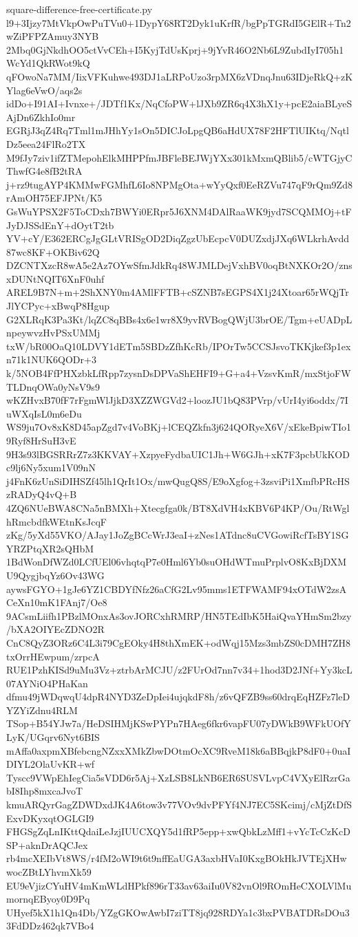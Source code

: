 \documentclass[11pt]{article}
\theoremstyle{definition}
\theoremstyle{remark}
\begin{document}
\begin{filecontents*}[overwrite]{square-difference-free-certificate.py}
l9+3Ijzy7MtVkpOwPuTVu0+1DypY68RT2Dyk1uKrfR/bgPpTGRdI5GElR+Tn2wZiPFPZAmuy3NYB
2Mbq0GjNkdhOO5ctVvCEh+I5KyjTdUsKprj+9jYvR46O2Nb6L9ZubdIyI705h1WcYd1QkRWot9kQ
qFOwoNa7MM/IixVFKuhwe493DJ1aLRPoUzo3rpMX6zVDnqJnu63IDjeRkQ+zKYlag6eVwO/aqs2s
idDo+I91AI+Ivnxe+/JDTf1Kx/NqCfoPW+lJXb9ZR6q4X3hX1y+pcE2aiaBLyeSAjDn6ZkhIo0mr
EGRjJ3qZ4Rq7Tml1mJHhYy1sOn5DICJoLpgQB6aHdUX78F2HFTlUIKtq/NqtlDz5eea24FlRo2TX
M9fJy7ziv1ifZTMepohElkMHPPfmJBFleBEJWjYXx301kMxmQBlib5/cWTGjyCThwfG4e8fB2tRA
j+rz9tugAYP4KMMwFGMhfL6Io8NPMgOta+wYyQxf0EeRZVu747qF9rQm9Zd8rAmOH75EFJPNt/K5
GsWuYPSX2F5ToCDxh7BWYi0ERpr5J6XNM4DAlRaaWK9jyd7SCQMMOj+tFJyDJSSdEnY+dOytT2tb
YV+cY/E362ERCgJgGLtVRISgOD2DiqZgzUbEcpcV0DUZxdjJXq6WLkrhAvdd87wc8KF+OKBiv62Q
DZCNTXzcR8wA5e2Az7OYwSfmJdkRq48WJMLDejVxhBV0oqBtNXKOr2O/znsxDUNtNQIT6XnF0uhf
AREL9B7N+m+2ShXNY0m4AMlFFTB+cSZNB7sEGPS4X1j24Xtoar65rWQjTrJlYCPyc+xBwqP8Hgup
G2XLRqK3Pa3Kt/lqZC8qBBs4x6e1wr8X9yvRVBogQWjU3brOE/Tgm+eUADpLnpeywvzHvPSxUMMj
txW/bR00OaQ10LDVY1dETm5SBDzZfhKcRb/IPOrTw5CCSJsvoTKKjkef3p1exn71k1NUK6QODr+3
k/5NOB4FfPHXzbkLfRpp7zysnDsDPVaShEHFI9+G+a4+VzsvKmR/mxStjoFWTLDnqOWa0yNsV9s9
wKZHvxB70fF7rFgmWlJjkD3XZZWGVd2+loozJU1bQ83PVrp/vUrI4yi6oddx/7IuWXqIsL0m6eDu
WS9ju7Ov8xK8D45apZgd7v4VoBKj+lCEQZkfn3j624QORyeX6V/xEkeBpiwTIo19Ryf8HrSuH3vE
9H3s93lBGSRRrZ7z3KKVAY+XzpyeFydbaUIC1Jh+W6GJh+xK7F3pcbUkKODc9lj6Ny5xum1V09nN
j4FnK6zUnSiDIHSZf45lh1QrIt1Ox/mwQugQ8S/E9oXgfog+3zsviPi1XmfbPRcHSzRADyQ4vQ+B
4ZQ6NUeBWA8CNa5nBMXh+Xtecgfga0k/BT8XdVH4xKBV6P4KP/Ou/RtWglhRmcbdfkWEtnKsJcqF
zKg/5yXd55VKO/AJay1JoZgBCcWrJ3eaI+zNes1ATdnc8uCVGowiRcfTsBY1SGYRZPtqXR2sQHbM
1BdWonDfWZd0LCfUEl06vhqtqP7e0Hml6Yb0suOHdWTmuPrplvO8KxBjDXMU9QygjbqYz6Ov43WG
aywsFGYO+1gJe6YZ1CBDYfNfz26aCfG2Lv95mms1ETFWAMF94xOTdW2zsACeXn10mK1FAnj7/Oe8
9ACsmLiifh1PBzlMOnxAs3ovJORCxhRMRP/HN5TEdIbK5HaiQvaYHmSm2bzy/bXA2OIYEcZDNO2R
CnC8QyZ3ORz6C4L3i79CgEOky4H8thXmEK+odWqj15Mzs3mbZS0cDMH7ZH8txOrrHEwpum/zrpcA
RUE1PzhKISd9uMu3Vz+ztrbArMCJU/z2FUrOd7nn7v34+1hod3D2JNf+Yy3kcL07AYNiO4PHaKan
dfmu49jWDqwqU4dpR4NYD3ZeDpIei4ujqkdF8h/z6vQFZB9ss60drqEqHZFz7leDYZYiZdnu4RLM
TSop+B54YJw7a/HeDSIHMjKSwPYPn7HAeg6fkr6vapFU07yDWkB9WFkUOfYLyK/UGqrv6Nyt6BIS
mAffa0axpmXBfebcngNZxxXMkZbwDOtmOcXC9RveM18k6aBBqjkP8dF0+0uaIDIYL2OlaUvKR+wf
Tyscc9VWpEhIegCia5sVDD6r5Aj+XzLSB8LkNB6ER6SUSVLvpC4VXyElRzrGabI8Ihp8mxcaJvoT
kmuARQyrGagZDWDxdJK4A6tow3v77VOv9dvPFYf4NJ7EC5SKcimj/cMjZtDfSExvDKyxqtOGLGI9
FHGSgZqLnIKttQdaiLeJzjIUUCXQY5d1fRP5epp+xwQbkLzMff1+vYcTcCzKcDSP+aknDrAQCJex
rb4mcXEIbVt8WS/r4fM2oWI9t6t9nffEaUGA3axbHVaI0KxgBOkHkJVTEjXHwwocZBtLYhvmXk59
EU9eVjizCYuHV4mKmWLdHPkf896rT33av63aiIu0V82vnOl9ROmHeCXOLVlMumornqEByoy0D9Pq
UHyef5kX1h1Qn4Db/YZgGKOwAwbI7ziTT8jq928RDYa1c3bxPVBATDRsDOu33FdDDz462qk7VBo4

\end{filecontents*}
\end{document}
